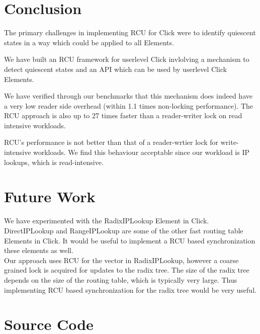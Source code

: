 \documentclass[a4paper]{article}
\begin{document}
\section{Conclusion}

The primary challenges in implementing RCU for Click were to
identify quiescent states in a way which could be applied to all
Elements. 

We have built an RCU framework for userlevel Click invlolving a
mechanism to detect quiescent states and an API which can be used by userlevel Click Elements.

We have verified through our benchmarks that this mechanism does
indeed have a very low reader side overhead (within 1.1 times
non-locking performance). The RCU approach is also up to 27 times
faster than a reader-writer lock on read intensive workloads.

RCU's performance is not better than that of a reader-wrtier lock for
write-intensive workloads. We find this behaviour acceptable since our
workload is IP lookups, which is read-intensive. 
\section{Future Work}

We have experimented with the RadixIPLookup Element in Click. DirectIPLookup and RangeIPLookup are some of the other fast routing table Elements in Click. It would be useful to implement a RCU based synchronization these elements as well.\\ 

Our approach uses RCU for the vector in RadixIPLookup, however a coarse grained lock is acquired for updates to the radix tree. The size of the radix tree depends on the size of the routing table, which is typically very large. Thus implementing RCU based synchronization for the radix tree would be very useful.

\appendix
\section{Source Code}
\label{sec:source}
\end{document}
